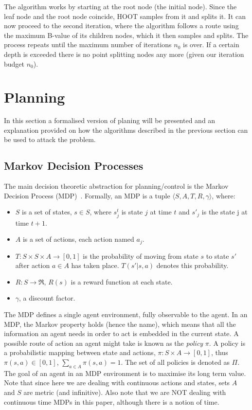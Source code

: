 \documentclass[conference]{IEEEtran}
\begin{document}
The algorithm works by starting at the root node (the initial node). Since the leaf node and the root node coincide, HOOT samples from it and splits it. It can now proceed to the second iteration, where the algorithm follows a route using the maximum B-value of its children nodes, which it then samples and splits. The process repeats until the maximum number of iterations $n_0$ is over. If a certain depth is exceeded there is no point splitting nodes any more (given our iteration budget $n_0$). 



\section{Planning}  \label{sec:Planning}
In this section a formalised version of planing will be presented and an explanation provided on how the algorithms described in the previous section can be used to attack the problem.
\subsection{Markov Decision Processes}

The main decision theoretic abstraction for planning/control is the Markov Decision Process (MDP)~\cite{howard1960dynamic}. Formally,  an MDP is a tuple $\langle S,A,T,R,\gamma\rangle$, where:

\begin{itemize}
\item $S$ is a set of states, $s \in S$, where $s_j^t$ is state $j$ at time $t$ and $s'_j$ is the state j at time $t+1$.
\item $A$ is a set of actions, each action named $a_j$.
\item  $T:S \times S \times  A  \rightarrow [0,1]$ is the probability of moving from state $s$ to state $s'$  after action $a \in A$ has taken place. $T(s'|s,a)$ denotes this probability.
\item  $R:S \rightarrow \Re$, $R(s)$ is a reward function at each state.
\item $\gamma$, a discount factor.
\end{itemize}

The MDP defines a single agent environment, fully observable to the agent. In an MDP, the Markov property holds (hence the name), which means that all the information an agent needs in order to act is embedded in the current state.
A possible route of action an agent might take is known as the \textit{policy} $\pi$. A policy is a probabilistic mapping between state and actions, $\pi:S \times A \rightarrow [0,1]$, thus $\pi(s,a) \in [0,1]$,  $\sum\limits_{a\in A}{\pi(s,a)} = 1$. The set of all policies is denoted as $\Pi$. The goal of an agent in an MDP environment is to maximise its long term value. Note that since here we are dealing with continuous actions and states, sets $A$ and $S$ are metric (and infinitive). Also note that we are NOT dealing with continuous time MDPs in this paper, although there is a notion of time. 
\end{document}
